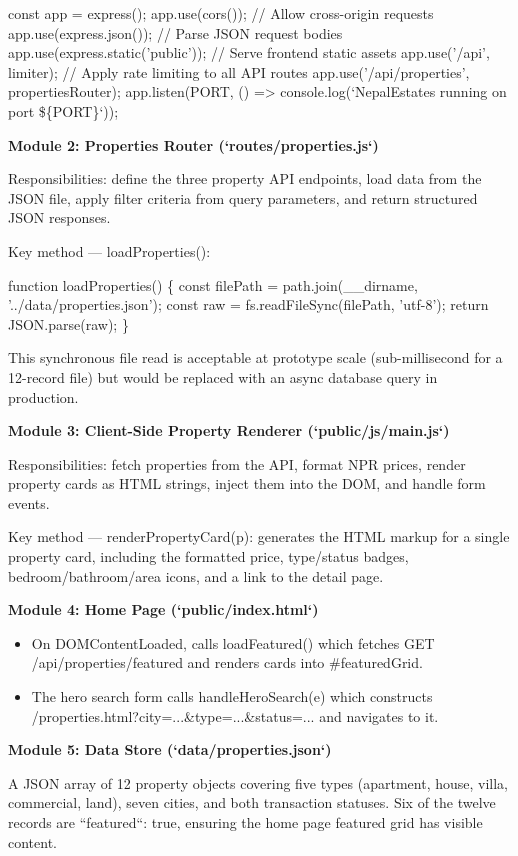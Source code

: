 \documentclass[12pt,a4paper]{report}
\begin{document}
const app = express();
app.use(cors());                        // Allow cross-origin requests
app.use(express.json());                // Parse JSON request bodies
app.use(express.static('public'));      // Serve frontend static assets
app.use('/api', limiter);               // Apply rate limiting to all API routes
app.use('/api/properties', propertiesRouter);
app.listen(PORT, () => console.log(`NepalEstates running on port \$\{PORT\}`));

\textbf{Module 2: Properties Router (`routes/properties.js`)}

Responsibilities: define the three property API endpoints, load data from the JSON file, apply filter criteria from query parameters, and return structured JSON responses.

Key method --- loadProperties():

function loadProperties() \{
  const filePath = path.join(\_\_dirname, '../data/properties.json');
  const raw = fs.readFileSync(filePath, 'utf-8');
  return JSON.parse(raw);
\}

This synchronous file read is acceptable at prototype scale (sub-millisecond for a 12-record file) but would be replaced with an async database query in production.

\textbf{Module 3: Client-Side Property Renderer (`public/js/main.js`)}

Responsibilities: fetch properties from the API, format NPR prices, render property cards as HTML strings, inject them into the DOM, and handle form events.

Key method --- renderPropertyCard(p): generates the HTML markup for a single property card, including the formatted price, type/status badges, bedroom/bathroom/area icons, and a link to the detail page.

\textbf{Module 4: Home Page (`public/index.html`)}

\begin{itemize}
  \item \textbullet{} On DOMContentLoaded, calls loadFeatured() which fetches GET /api/properties/featured and renders cards into \#featuredGrid.
  \item \textbullet{} The hero search form calls handleHeroSearch(e) which constructs /properties.html?city=...\&type=...\&status=... and navigates to it.
\end{itemize}
\textbf{Module 5: Data Store (`data/properties.json`)}

A JSON array of 12 property objects covering five types (apartment, house, villa, commercial, land), seven cities, and both transaction statuses. Six of the twelve records are ``featured``: true, ensuring the home page featured grid has visible content.
\end{document}
